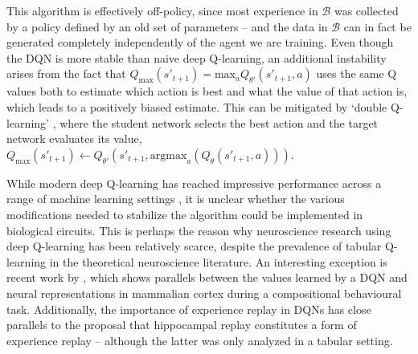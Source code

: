 This algorithm is effectively off-policy, since most experience in $\mathcal{B}$ was collected by a policy defined by an old set of parameters -- and the data in $\mathcal{B}$ can in fact be generated completely independently of the agent we are training.
Even though the DQN is more stable than naive deep Q-learning, an additional instability arises from the fact that $Q_{\text{max}}(s'_{t+1}) = \text{max}_a Q_{\theta'}(s'_{t+1}, a)$ uses the same Q values both to estimate which action is best and what the value of that action is, which leads to a positively biased estimate.
This can be mitigated by `double Q-learning' \citep{van2016deep}, where the student network selects the best action and the target network evaluates its value, $Q_{\text{max}}(s'_{t+1}) \leftarrow Q_{\theta'}(s'_{t+1}, \text{argmax}_a(Q_{\theta}(s'_{t+1}, a)))$.

While modern deep Q-learning has reached impressive performance across a range of machine learning settings \citep{mnih2013playing, lillicrap2015continuous, schaul2015prioritized, kalashnikov2018qt}, it is unclear whether the various modifications needed to stabilize the algorithm could be implemented in biological circuits.
This is perhaps the reason why neuroscience research using deep Q-learning has been relatively scarce, despite the prevalence of tabular Q-learning in the theoretical neuroscience literature.
An interesting exception is recent work by \citet{makino2023arithmetic}, which shows parallels between the values learned by a DQN and neural representations in mammalian cortex during a compositional behavioural task.
Additionally, the importance of experience replay in DQNs \citep{mnih2013playing, schaul2015prioritized} has close parallels to the proposal that hippocampal replay constitutes a form of experience replay \citep{mattar2018prioritized} -- although the latter was only analyzed in a tabular setting.

